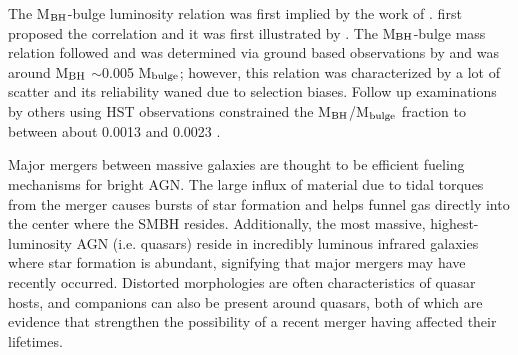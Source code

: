 \documentclass[manuscript]{aastex}
\begin{document}




The M$_{\rm BH}$-bulge luminosity relation was first implied by the work of \cite{Dressler1988}. \cite{Dressler1989} first proposed the correlation and it was first illustrated by \cite{Kormendy1993}. The M$_{\rm BH}$-bulge mass relation followed and was determined via ground based observations by \cite{Magorrian1998} and was around M$_{\rm BH}$ $\sim$0.005 M$_{\rm bulge}$; however, this relation was characterized by a lot of scatter and its reliability waned due to selection biases.  Follow up examinations by others using HST observations constrained the M$_{\rm BH}$/M$_{\rm bulge}$ fraction to between about 0.0013 and 0.0023 \citep{Merritt2001a,McLure2001,Marconi2003}. 

Major mergers between massive galaxies are thought to be efficient fueling mechanisms for bright AGN. The large influx of material due to tidal torques from the merger causes bursts of star formation and helps funnel gas directly into the center where the SMBH resides. \citep{Richards2006,Reddy2008,Hopkins2010} Additionally, the most massive, highest-luminosity AGN (i.e. quasars) reside in incredibly luminous infrared galaxies where star formation is abundant, signifying that major mergers may have recently occurred. \citep{Treister2012} Distorted morphologies are often characteristics of quasar hosts, and companions can also be present around quasars, both of which are evidence that strengthen the possibility of a recent merger having affected their lifetimes. 
\end{document}
